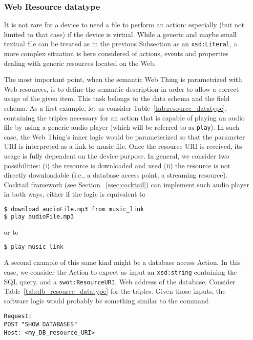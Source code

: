 \subsubsection{\textsf{Web Resource datatype}}

It is not rare for a device to need a file to perform an action: especially (but not limited to that case) if the device is virtual. While a generic and maybe small textual file can be treated as in the previous Subsection as an \texttt{xsd:Literal}, a more complex situation is here considered of actions, events and properties dealing with generic resources located on the Web.

The most important point, when the semantic Web Thing is parametrized with Web resources, is to define the semantic description in order to allow a correct usage of the given item. This task belongs to the data schema and the field schema. As a first example, let us consider Table~\ref{tab:resource_datatype}, containing the triples necessary for an action that is capable of playing an audio file by using a generic audio player (which will be referred to as \texttt{play}). In such case, the Web Thing's inner logic would be parameterized so that the parameter URI is interpreted as a link to music file. Once the resource URI is received, its usage is fully dependent on the device purpose. In general, we consider two possibilities: (i) the resource is downloaded and used (ii) the resource is not directly downloadable (i.e., a database access point, a streaming resource). Cocktail framework (see Section~ \ref{ssec:cocktail}) can implement such audio player in both ways, either if the logic is equivalent to
\begin{lstlisting}[language=bash]
$ download audioFile.mp3 from music_link
$ play audioFile.mp3
\end{lstlisting}
or to
\begin{lstlisting}[language=bash]
$ play music_link
\end{lstlisting} 

A second example of this same kind might be a database access Action. In this case, we consider the Action to expect as input an \texttt{xsd:string} containing the SQL query, and a \texttt{swot:ResourceURI}, Web address of the database. Consider Table~\ref{tab:db_resource_datatype} for the triples. Given those inputs, the software logic would probably be something similar to the command
\begin{lstlisting}
Request:
POST "SHOW DATABASES"
Host: <my_DB_resource_URI>
\end{lstlisting}

